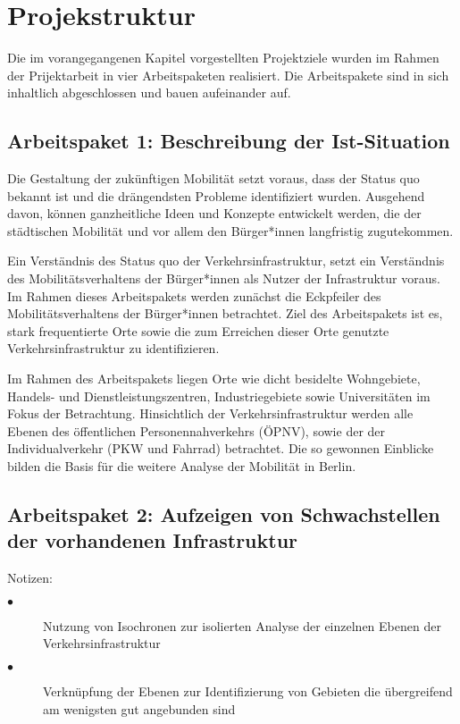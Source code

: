 \newpage
\section{Projekstruktur} \label{projektbeschreibung}
Die im vorangegangenen Kapitel vorgestellten Projektziele wurden im Rahmen der Prijektarbeit in vier Arbeitspaketen realisiert. Die Arbeitspakete sind in sich inhaltlich abgeschlossen und bauen aufeinander auf.

\subsection{Arbeitspaket 1: Beschreibung der Ist-Situation}
Die Gestaltung der zukünftigen Mobilität setzt voraus, dass der Status quo bekannt ist und die drängendsten Probleme identifiziert wurden. Ausgehend davon, können ganzheitliche Ideen und Konzepte entwickelt werden, die der städtischen Mobilität und vor allem den Bürger*innen langfristig zugutekommen.

Ein Verständnis des Status quo der Verkehrsinfrastruktur, setzt ein Verständnis des Mobilitätsverhaltens der Bürger*innen als Nutzer der Infrastruktur voraus. Im Rahmen dieses Arbeitspakets werden zunächst die Eckpfeiler des Mobilitätsverhaltens der Bürger*innen betrachtet. Ziel des Arbeitspakets ist es, stark frequentierte Orte sowie die zum Erreichen dieser Orte genutzte Verkehrsinfrastruktur zu identifizieren. 

Im Rahmen des Arbeitspakets liegen Orte wie dicht besidelte Wohngebiete, Handels- und Dienstleistungszentren, Industriegebiete sowie Universitäten im Fokus der Betrachtung. Hinsichtlich der Verkehrsinfrastruktur werden alle Ebenen des öffentlichen Personennahverkehrs (ÖPNV), sowie der der Individualverkehr (PKW und Fahrrad) betrachtet. Die so gewonnen Einblicke bilden die Basis für die weitere Analyse der Mobilität in Berlin.

\subsection{Arbeitspaket 2: Aufzeigen von Schwachstellen der vorhandenen Infrastruktur}
Notizen: 
\begin{description}
    \item[$\bullet$] Nutzung von Isochronen zur isolierten Analyse der einzelnen Ebenen der Verkehrsinfrastruktur
    \item[$\bullet$] Verknüpfung der Ebenen zur Identifizierung von Gebieten die übergreifend am wenigsten gut angebunden sind
  \end{description} 

